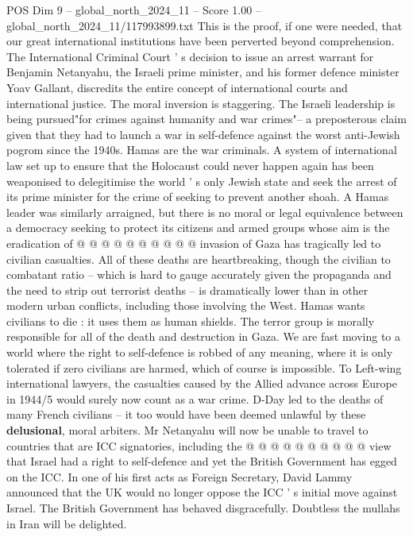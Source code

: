 \begin{textsample}{POS Dim 9 – global\_north\_2024\_11 – Score 1.00 – global\_north\_2024\_11/117993899.txt}  \label{ex:f9_pos_241}
This is the proof, if one were needed, that our great international institutions have been perverted beyond comprehension.
The International Criminal Court ' s decision to issue an arrest warrant for Benjamin Netanyahu, the Israeli prime minister, and his former defence minister Yoav Gallant, discredits the entire concept of international courts and international justice.
The moral inversion is staggering.
The Israeli leadership is being pursued"for crimes against humanity and war crimes"-- a preposterous claim given that they had to launch a war in self-defence against the worst anti-Jewish pogrom since the 1940s.
Hamas are the war criminals.
A system of international law set up to ensure that the Holocaust could never happen again has been weaponised to delegitimise the world ' s only Jewish state and seek the arrest of its prime minister for the crime of seeking to prevent another shoah.
A Hamas leader was similarly arraigned, but there is no moral or legal equivalence between a democracy seeking to protect its citizens and armed groups whose aim is the eradication of @ @ @ @ @ @ @ @ @ @ invasion of Gaza has tragically led to civilian casualties.
All of these deaths are heartbreaking, though the civilian to combatant ratio -- which is hard to gauge accurately given the propaganda and the need to strip out terrorist deaths -- is dramatically lower than in other modern urban conflicts, including those involving the West.
Hamas wants civilians to die : it uses them as human shields.
The terror group is morally responsible for all of the death and destruction in Gaza.
We are fast moving to a world where the right to self-defence is robbed of any meaning, where it is only tolerated if zero civilians are harmed, which of course is impossible.
To Left-wing international lawyers, the casualties caused by the Allied advance across Europe in 1944/5 would surely now count as a war crime.
D-Day led to the deaths of many French civilians -- it too would have been deemed unlawful by these \textbf{delusional}, moral arbiters.
Mr Netanyahu will now be unable to travel to countries that are ICC signatories, including the @ @ @ @ @ @ @ @ @ @ view that Israel had a right to self-defence and yet the British Government has egged on the ICC.
In one of his first acts as Foreign Secretary, David Lammy announced that the UK would no longer oppose the ICC ' s initial move against Israel.
The British Government has behaved disgracefully.
Doubtless the mullahs in Iran will be delighted.

\end{textsample}
